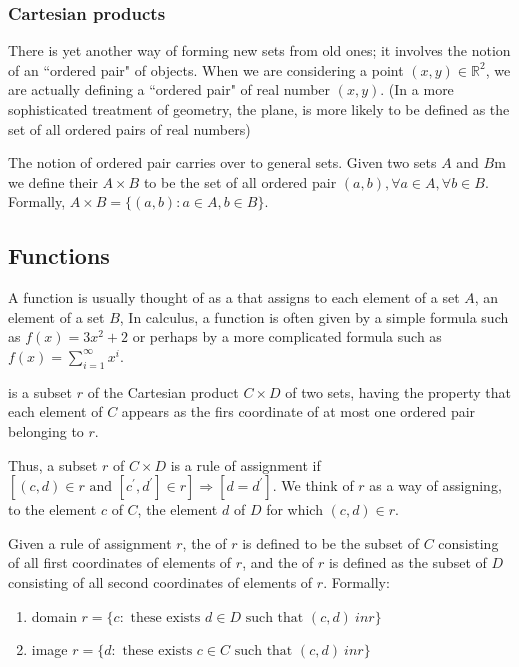 \subsubsection{Cartesian products}

There is yet another way of forming new sets from old ones; it involves the notion of an ``ordered pair" of objects. When we are considering a point $(x, y) \in \mathbb{R}^2$, we are actually defining a ``ordered pair" of real number $(x, y)$. (In a more sophisticated treatment of geometry, the plane, is more likely to be defined as the set of all ordered pairs of real numbers)

The notion of ordered pair carries over to general sets. Given two sets $A$ and $B$m we define their \textbf{} $A \times B$ to be the set of all ordered pair $(a, b), \forall a \in A, \forall b \in B$. Formally, $A \times B = \{(a, b): a \in A, b \in B\}$.


\subsection{Functions}

A function is usually thought of as a  that assigns to each element of a set $A$, an element of a set $B$, In calculus, a function is often given by a simple formula such as $f(x) = 3x^2 + 2$ or perhaps by a more complicated formula such as $f(x) = \sum_{i=1}^{\infty}x^i$.

\begin{definition}
\textbf{} is a subset $r$ of the Cartesian product $C \times D$ of two sets, having the property that each element of $C$ appears as the firs coordinate of at most one ordered pair belonging to $r$.
\end{definition}

Thus, a subset $r$ of $C \times D$ is a rule of assignment if $[(c, d) \in r \text{ and } [c^{\prime}, d^{\prime}] \in r] \Rightarrow [d = d^{\prime}]$. We think of $r$ as a way of assigning, to the element $c$ of $C$, the element $d$ of $D$ for which $(c, d) \in r$.

Given a rule of assignment $r$, the \textbf{} of $r$ is defined to be the subset of $C$ consisting of all first coordinates of elements of $r$, and the \textbf{} of $r$ is defined as the subset of $D$ consisting of all second coordinates of elements of $r$. Formally:
\begin{enumerate}[itemsep=0pt]
    \item domain $r= \{c: \text{ these exists } d \in D \text{ such that } (c, d) \ in r\}$
    \item image $r = \{d: \text{ these exists } c \in C \text{ such that } (c, d) \ in r\}$
\end{enumerate}

